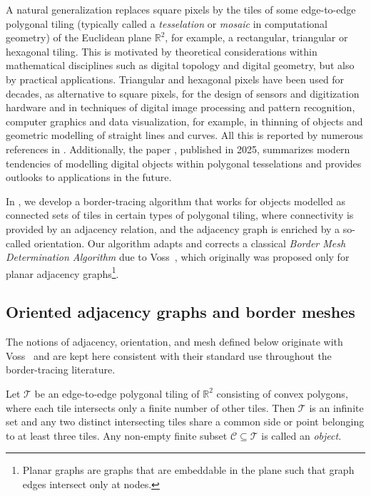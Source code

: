 A natural generalization replaces square pixels by the tiles of some edge-to-edge polygonal tiling (typically called a \emph{tesselation} or \emph{mosaic} in computational geometry) of the Euclidean plane $\mathbb{R}^2$, for example, a rectangular, triangular or hexagonal tiling.
This is motivated by theoretical considerations within mathematical disciplines such as digital topology and digital geometry, but also by practical applications.
Triangular and hexagonal pixels have been used for decades, as alternative to square pixels, for the design of sensors and digitization hardware and in techniques of digital image processing and pattern recognition, computer graphics and data visualization, for example, in thinning of objects and geometric modelling of straight lines and curves.
All this is reported by numerous references in \cite{WiederholdMatosWiederhold2026}.
Additionally, the paper \cite{Magillo2025}, published in 2025, summarizes modern tendencies of modelling digital objects within polygonal tesselations and provides outlooks to applications in the future.

In \cite{WiederholdMatosWiederhold2026}, we develop a border-tracing algorithm that works for objects modelled as connected sets of tiles in certain types of polygonal tiling, where connectivity is provided by an adjacency relation, and the adjacency graph is enriched by a so-called orientation.
Our algorithm adapts and corrects a classical \emph{Border Mesh Determination Algorithm} due to Voss~\cite{voss1993}, which originally was proposed only for planar adjacency graphs\footnote{Planar graphs are graphs that are embeddable in the plane such that graph edges intersect only at nodes.}.

\subsection{Oriented adjacency graphs and border meshes}\label{subsec:oriented-adj}

The notions of adjacency, orientation, and mesh defined below originate with Voss~\cite{voss1993} and are kept here consistent with their standard use throughout the border-tracing literature.

Let $\mathcal{T}$ be an edge-to-edge polygonal tiling of $\mathbb{R}^2$ consisting of convex polygons, where each tile intersects only a finite number of other tiles.
Then $\mathcal{T}$ is an infinite set and any two distinct intersecting tiles share a common side or point belonging to at least three tiles.
Any non-empty finite subset $\mathcal{C} \subseteq \mathcal{T}$ is called an \emph{object}.

